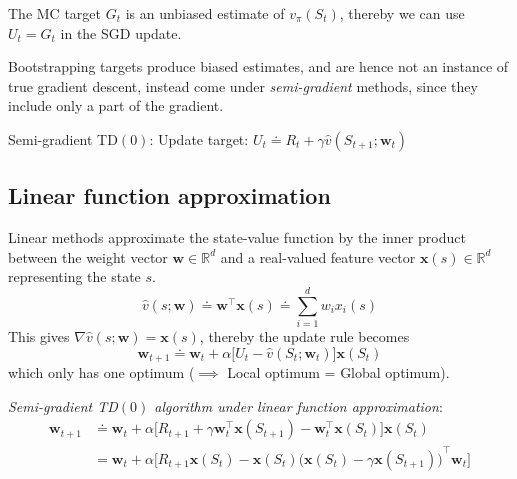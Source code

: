 The MC target \( G_t \) is an unbiased estimate of \( v_\pi(S_t) \), thereby we can use \( U_t = G_t \) in the SGD update.

Bootstrapping targets produce biased estimates, and are hence not an instance of true gradient descent, instead come under \textit{semi-gradient} methods, since they include only a part of the gradient.

Semi-gradient TD\( (0) \): Update target: \( U_t \doteq R_t + \gamma \hat v(S_{t+1}; \mathbf{w}_t) \)

\subsection{Linear function approximation}

Linear methods approximate the state-value function by the inner product between the weight vector \( \mathbf{w} \in \mathbb{R}^d \) and a real-valued feature vector \( \mathbf{x}(s) \in \mathbb{R}^d \) representing the state \( s \).
\begin{equation}
    \hat v(s; \mathbf{w}) \doteq \mathbf{w}^\top \mathbf{x}(s) \doteq \sum_{i=1}^d w_i x_i(s)
\end{equation}
This gives \( \nabla \hat v(s; \mathbf{w}) = \mathbf{x}(s) \), thereby the update rule becomes
\begin{equation}
    \mathbf{w}_{t+1} \doteq \mathbf{w}_t + \alpha \Big[ U_t - \hat v(S_t; \mathbf{w}_t) \Big] \mathbf{x}(S_t)
\end{equation}
which only has one optimum (\( \implies \) Local optimum = Global optimum).

\textit{Semi-gradient TD\( (0) \) algorithm under linear function approximation}:
\begin{equation}
    \begin{aligned}
        \mathbf{w}_{t+1}
         & \doteq
        \mathbf{w}_t + \alpha \Big[ R_{t+1} + \gamma \mathbf{w}_t^\top \mathbf{x}(S_{t+1}) - \mathbf{w}_t^\top \mathbf{x}(S_t) \Big] \mathbf{x}(S_t)
        \\ & =
        \mathbf{w}_t + \alpha \Big[ R_{t+1} \mathbf{x}(S_t) - \mathbf{x}(S_t) {\big( \mathbf{x}(S_t) - \gamma \mathbf{x}(S_{t+1}) \big)}^\top \mathbf{w}_t \Big]
    \end{aligned}
\end{equation}


